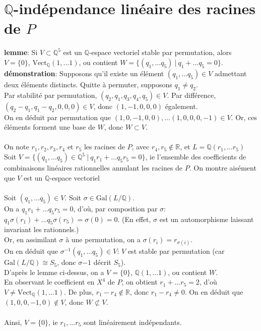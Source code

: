 \documentclass[a4paper, 12pt]{article}
\begin{document}
	
	\section{$\mathbb Q$-indépendance linéaire des racines de $P$}
	\textbf{lemme}: Si $V \subset \mathbb Q^5$ est un $\mathbb Q$-espace vectoriel stable par permutation, alors $V = \{0\}$, $\mathrm{Vect}_\mathbb Q (1, \dots 1)$, ou contient $W = \{(q_1, \dots q_5) \ |\ q_1 + \dots q_5 = 0\}$. \\
	\textbf{démonstration}: Supposons qu'il existe un élément  $(q_1, \dots q_5) \in V$ admettant deux éléments distincts. Quitte à permuter, supposons $q_1 \not = q_2$. \\
	Par stabilité par permutation, $(q_2, q_1, q_3, q_4, q_5) \in V$. Par différence, $(q_2 - q_1, q_1 - q_2, 0, 0, 0) \in V$, donc $(1, -1, 0, 0, 0)$ également.\\ On en déduit par permutation que $(1, 0, -1, 0, 0), \dots (1, 0, 0, 0, -1) \in V$. Or, ces éléments forment une base de $W$, donc $W \subset V$.
	\\ \\
	
	On note $r_1, r_2, r_3, r_4 \text{ et } r_5$ les racines de $P$, avec $r_4, r_5 \not \in \mathbb R$, et $L = \mathbb Q (r_1, \dots r_5)$ \\
	Soit $V = \{(q_1, \dots q_5) \in \mathbb Q^5\ |\ q_1 r_1 + \dots q_5 r_5 = 0\}$, ie l'ensemble des coefficients de combinaisons linéaires rationnelles annulant les racines de $P$. On montre aisément que $V$ est un $\mathbb Q$-espace vectoriel
	\\ \\
	
	Soit $(q_1, \dots q_5) \in V$. Soit $\sigma \in \mathrm{Gal} (L/\mathbb Q)$. \\
	On a $q_1 r_1 + \dots q_5 r_5 = 0$, d'où, par composition par $\sigma$: $q_1 \sigma (r_1) + \dots q_5 \sigma(r_5) = \sigma(0) = 0$. (En effet, $\sigma$ est un automorphisme laissant invariant les rationnels.) \\
	Or, en assimilant $\sigma$ à une permutation, on a $\sigma(r_i) = r_{\sigma(i)}$.\\ On en déduit que $\sigma^{-1}(q_1, \dots q_5) \in V$: $V$ est stable par permutation (car $\mathrm{Gal} (L/\mathbb Q) \cong S_5$, donc $\sigma{-1}$ décrit $S_5$). \\
	
	D'après le lemme ci-dessus, on a $V = \{0\}$, $\mathbb Q (1, \dots 1)$, ou contient $W$.\\
	En observant le coefficient en $X^4$ de $P$, on obtient $r_1 + \dots r_5 = 2$, d'où $V \not = \mathrm{Vect}_\mathbb Q (1, \dots 1)$. De plus, $r_1-r_4 \not \in \mathbb R$, donc $r_1 - r_4 \not = 0$. On en déduit que $(1, 0, 0, -1, 0) \not \in V$, donc $W \not \subset V$.
	\\ \\
	Ainsi, $V = \{0\}$, ie $r_1, \dots r_5$ sont linéairement indépendants.
	
\end{document}
